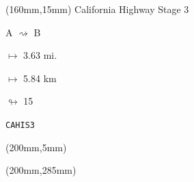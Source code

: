 \begin{textblock*}{40mm}(160mm,15mm)%
California Highway Stage 3
\par A $\rightsquigarrow$ B
\Large
\par$\mapsto$ 3.63 mi.
\par$\mapsto$ 5.84 km
\par$\looparrowright$ 15
\par\hfill\tiny\tt CAHIS3\\
\end{textblock*}
\begin{textblock*}{20mm}(200mm,5mm)%
\fbox{\thepage}
\end{textblock*}
\begin{textblock*}{20mm}(200mm,285mm)%
\fbox{\thepage}
\end{textblock*}
\null\newpage

